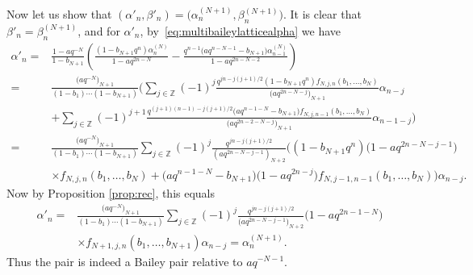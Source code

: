 \documentclass[11pt]{article}
\numberwithin{equation}{section}
\newcommand{\field}[1]{\mathbb{#1}}
\newcommand{\Z}{\field{Z}}
\begin{document}
Now let us show that $(\alpha'_n,\beta'_n) = \bigl(\alpha^{(N+1)}_n,\beta^{(N+1)}_n\bigr)$.
It is clear that $\beta'_n=\beta^{(N+1)}_n$, and for $\alpha'_n$, by~\eqref{eq:multibaileylatticealpha} we have
\begin{align*}
\alpha'_n
={}&\frac{1-aq^{-N}}{1-b_{N+1}}\left(\frac{(1-b_{N+1}q^n) \alpha_n^{(N)}}{1-aq^{2n-N}}-\frac{q^{n-1}\bigl(aq^{n-N-1}-b_{N+1}\bigr) \alpha_{n-1}^{(N)}}{1-aq^{2n-N-2}}\right)\\
={}& \frac{\bigl(aq^{-N}\bigr)_{N+1}}{(1-b_1)\cdots(1-b_{N+1})} \bigg(\sum_{j \in \Z}(-1)^j\frac{q^{jn-j(j+1)/2}(1-b_{N+1}q^n)f_{N,j,n}(b_1,\ldots,b_N)}{\bigl(aq^{2n-N-j}\bigr)_{N+1}} \alpha_{n-j} \\
& +\sum_{j \in \Z}(-1)^{j+1}\frac{q^{(j+1)(n-1)-j(j+1)/2}\bigl(aq^{n-1-N}-b_{N+1}\bigr)f_{N,j,n-1}(b_1,\ldots,b_N)}{\bigl(aq^{2n-2-N-j}\bigr)_{N+1}} \alpha_{n-1-j} \bigg)\\
={}& \frac{\bigl(aq^{-N}\bigr)_{N+1}}{(1-b_1)\cdots(1-b_{N+1})} \sum_{j \in \Z}(-1)^j\frac{q^{jn-j(j+1)/2}}{(aq^{2n-N-j-1})_{N+2}} \big( (1-b_{N+1}q^n)\bigl(1-aq^{2n-N-j-1}\bigr)
\\
& \times f_{N,j,n}(b_1,\ldots,b_N)+ \bigl(aq^{n-1-N}-b_{N+1}\bigr)\bigl(1-aq^{2n-j}\bigr)f_{N,j-1,n-1}(b_1,\ldots,b_N) \big) \alpha_{n-j}.
\end{align*}
Now by Proposition \ref{prop:rec}, this equals
\begin{align*}
\alpha'_n
={}& \frac{\bigl(aq^{-N}\bigr)_{N+1}}{(1-b_1)\cdots(1-b_{N+1})} \sum_{j \in \Z}(-1)^j\frac{q^{jn-j(j+1)/2}}{\bigl(aq^{2n-N-j-1}\bigr)_{N+2}} \bigl(1-aq^{2n-1-N}\bigr)\\
&\times f_{N+1,j,n}(b_1,\ldots,b_{N+1}) \alpha_{n-j}
= \alpha_n^{(N+1)}.
\end{align*}
Thus the pair  is indeed a Bailey pair relative to $aq^{-N-1}$.
\end{document}

